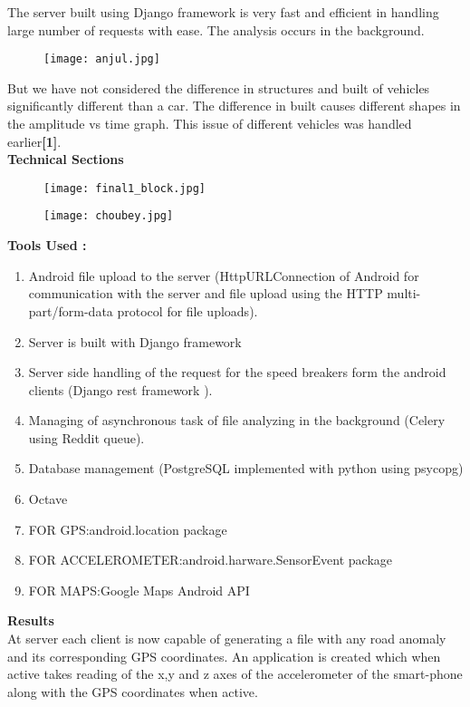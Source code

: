 \documentclass[12pt]{report}
\begin{document}
The server built using Django framework is very fast and efficient in handling large number of requests with ease. The analysis occurs in the background.
\begin{figure}[ht!]
\centering
\texttt{[image: anjul.jpg]}
\end{figure}
\newpage 
But we have not considered the difference in structures and built of vehicles significantly different than a car. The difference in built causes different shapes in the amplitude vs time graph. This issue of different vehicles was handled earlier\textbf{[1]}.\\
\textbf{Technical Sections}
\begin{figure}[ht!]
\centering
\texttt{[image: final1\_block.jpg]}
\end{figure} 
\begin{figure}[ht!]
\centering
\texttt{[image: choubey.jpg]}
\end{figure} 
\newpage
\textbf{Tools Used :}
\begin{enumerate}
\item Android file upload to the server (HttpURLConnection of Android for communication with the server and file upload using the HTTP multi-part/form-data protocol for file uploads).
\item Server is built with Django framework
\item Server side handling of the request for the speed breakers form the android clients (Django rest framework ).
\item Managing of asynchronous task of file analyzing in the background (Celery using Reddit queue).
\item Database management (PostgreSQL implemented with python using psycopg)
\item Octave
\item FOR GPS:android.location package 
\item FOR ACCELEROMETER:android.harware.SensorEvent	 					package
\item FOR MAPS:Google Maps Android API\\
\end{enumerate}
\textbf{Results}\\
At server each client is now capable of generating a file with any road anomaly and its corresponding GPS coordinates.
An application is created which when active takes reading of the x,y and z axes of the accelerometer of the smart-phone along with the GPS coordinates when active.
\end{document}

